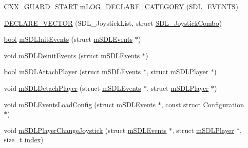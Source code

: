 \begin{DoxyCompactItemize}
\item 
\mbox{\hyperlink{__builder_8h_af721f4bd9a2c3267a89d3967b3ca1747}{C\+X\+X\+\_\+\+G\+U\+A\+R\+D\+\_\+\+S\+T\+A\+RT}} \mbox{\hyperlink{sdl-events_8h_abaf47b00f2e630b71ffa6912ff5b1c74}{m\+L\+O\+G\+\_\+\+D\+E\+C\+L\+A\+R\+E\+\_\+\+C\+A\+T\+E\+G\+O\+RY}} (S\+D\+L\+\_\+\+E\+V\+E\+N\+TS)
\item 
\mbox{\hyperlink{sdl-events_8h_aca34e3b8568f0b8e02b6b12d7f3a0eec}{D\+E\+C\+L\+A\+R\+E\+\_\+\+V\+E\+C\+T\+OR}} (S\+D\+L\+\_\+\+Joystick\+List, struct \mbox{\hyperlink{sdl-events_8h_struct_s_d_l___joystick_combo}{S\+D\+L\+\_\+\+Joystick\+Combo}})
\item 
\mbox{\hyperlink{libretro_8h_a4a26dcae73fb7e1528214a068aca317e}{bool}} \mbox{\hyperlink{sdl-events_8h_a803e62a43bd8bd79f66510edda922fd0}{m\+S\+D\+L\+Init\+Events}} (struct \mbox{\hyperlink{sdl-events_8h_structm_s_d_l_events}{m\+S\+D\+L\+Events}} $\ast$)
\item 
void \mbox{\hyperlink{sdl-events_8h_af4ddb8c7e038688031b6635a928ae7fc}{m\+S\+D\+L\+Deinit\+Events}} (struct \mbox{\hyperlink{sdl-events_8h_structm_s_d_l_events}{m\+S\+D\+L\+Events}} $\ast$)
\item 
\mbox{\hyperlink{libretro_8h_a4a26dcae73fb7e1528214a068aca317e}{bool}} \mbox{\hyperlink{sdl-events_8h_a8feb0dd91a28d3788bada7e6ee19d0ad}{m\+S\+D\+L\+Attach\+Player}} (struct \mbox{\hyperlink{sdl-events_8h_structm_s_d_l_events}{m\+S\+D\+L\+Events}} $\ast$, struct \mbox{\hyperlink{sdl-events_8h_structm_s_d_l_player}{m\+S\+D\+L\+Player}} $\ast$)
\item 
void \mbox{\hyperlink{sdl-events_8h_a14ff9c1218058211b6b5ddf4e8793dc3}{m\+S\+D\+L\+Detach\+Player}} (struct \mbox{\hyperlink{sdl-events_8h_structm_s_d_l_events}{m\+S\+D\+L\+Events}} $\ast$, struct \mbox{\hyperlink{sdl-events_8h_structm_s_d_l_player}{m\+S\+D\+L\+Player}} $\ast$)
\item 
void \mbox{\hyperlink{sdl-events_8h_a3c3efdcde7fe2309c3858a37ad72c0b3}{m\+S\+D\+L\+Events\+Load\+Config}} (struct \mbox{\hyperlink{sdl-events_8h_structm_s_d_l_events}{m\+S\+D\+L\+Events}} $\ast$, const struct Configuration $\ast$)
\item 
void \mbox{\hyperlink{sdl-events_8h_a3a4fc78a8a0a3803658a89cce1b2f300}{m\+S\+D\+L\+Player\+Change\+Joystick}} (struct \mbox{\hyperlink{sdl-events_8h_structm_s_d_l_events}{m\+S\+D\+L\+Events}} $\ast$, struct \mbox{\hyperlink{sdl-events_8h_structm_s_d_l_player}{m\+S\+D\+L\+Player}} $\ast$, size\+\_\+t \mbox{\hyperlink{isa-lr35902_8c_ac9ee548085af12859cb52a6c757cf73a}{index}})

\end{DoxyCompactItemize}
